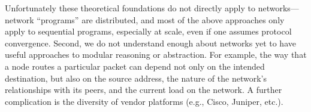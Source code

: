 Unfortunately these theoretical foundations do not directly apply to networks---network ``programs'' are distributed, and most of the above approaches only apply to sequential programs, especially at scale, even if one assumes protocol convergence. Second, we do not understand enough about networks yet to have useful approaches to modular reasoning or abstraction.  For example, the way that a node routes a particular packet can depend not only on the intended destination, but also on the source address, the nature of the network's relationships with its peers, and the current load on the network.  A further complication is the diversity of vendor platforms (e.g., Cisco, Juniper, etc.).

